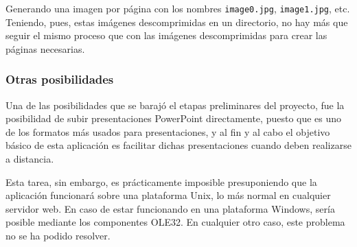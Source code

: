 Generando una imagen por página con los nombres \texttt{image0.jpg}, \texttt{image1.jpg}, etc. Teniendo, pues, estas imágenes descomprimidas en un directorio, no hay más que seguir el mismo proceso que con las imágenes descomprimidas para crear las páginas necesarias.


\subsubsection{Otras posibilidades} %
\label{ssub:otras_posibilidades}

Una de las posibilidades que se barajó el etapas preliminares del proyecto, fue la posibilidad de subir presentaciones PowerPoint directamente, puesto que es uno de los formatos más usados para presentaciones, y al fin y al cabo el objetivo básico de esta aplicación es facilitar dichas presentaciones cuando deben realizarse a distancia.

Esta tarea, sin embargo, es prácticamente imposible presuponiendo que la aplicación funcionará sobre una plataforma Unix, lo más normal en cualquier servidor web. En caso de estar funcionando en una plataforma Windows, sería posible mediante los componentes OLE32. En cualquier otro caso, este problema no se ha podido resolver.



